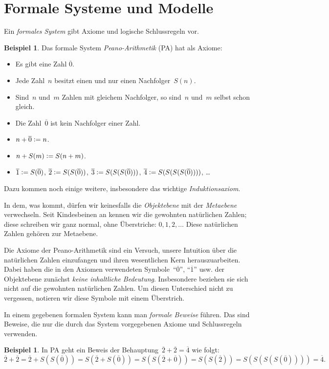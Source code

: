 \documentclass[twoside]{../zirkelblatt1415}
\theoremstyle{definition}
\newtheorem{bsp}[defn]{Beispiel}
\theoremstyle{plain}
\theoremstyle{remark}
\newcommand{\defeq}{\vcentcolon=}
\newcommand{\ol}[1]{\overline{#1}}
\begin{document}
\section{Formale Systeme und Modelle}

Ein \emph{formales System} gibt Axiome und logische Schlussregeln vor.

\begin{bsp}Das formale System \emph{Peano-Arithmetik} (PA) hat als Axiome:
\begin{itemize}
\item Es gibt eine Zahl $\ol{0}$.
\item Jede Zahl~$n$ besitzt einen und nur einen Nachfolger~$S(n)$.
\item Sind~$n$ und~$m$ Zahlen mit gleichem Nachfolger, so sind~$n$ und~$m$
selbst schon gleich.
\item Die Zahl~$\ol{0}$ ist kein Nachfolger einer Zahl.
\item $n + \ol{0} \defeq n$.
\item $n + S(m) \defeq S(n+m)$.
\item $\ol{1} \defeq S(\ol{0})$, $\ol{2} \defeq S(S(\ol{0}))$, $\ol{3} \defeq S(S(S(\ol{0})))$, $\ol{4} \defeq
S(S(S(S(\ol{0}))))$, \ldots
\end{itemize}
Dazu kommen noch einige weitere, insbesondere das wichtige
\emph{Induktionsaxiom}.
\end{bsp}

In dem, was kommt, dürfen wir keinesfalls die \emph{Objektebene} mit der
\emph{Metaebene} verwechseln. Seit Kindesbeinen an kennen wir die gewohnten
natürlichen Zahlen; diese schreiben wir ganz normal, ohne Überstriche:
$0,1,2,\ldots$ Diese natürlichen Zahlen gehören zur Metaebene.

Die Axiome der Peano-Arithmetik sind ein Versuch, unsere Intuition über die
natürlichen Zahlen einzufangen und ihren wesentlichen Kern herauszuarbeiten.
Dabei haben die in den Axiomen verwendeten Symbole~"`$\ol{0}$"', "`$\ol{1}$"'
usw. der Objektebene zunächst \emph{keine inhaltliche Bedeutung}. Insbesondere
beziehen sie sich nicht auf die gewohnten natürlichen Zahlen. Um diesen
Unterschied nicht zu vergessen, notieren wir diese Symbole mit einem
Überstrich.

In einem gegebenen formalen System kann man \emph{formale Beweise} führen. Das
sind Beweise, die nur die durch das System vorgegebenen Axiome und
Schlussregeln verwenden.

\begin{bsp}In PA geht ein Beweis der Behauptung~$\ol{2} + \ol{2} = \ol{4}$ wie folgt:
\[
  \ol{2} + \ol{2} = \ol{2} + S(S(\ol{0})) = S(\ol{2} + S(\ol{0})) = S(S(\ol{2} + \ol{0})) = S(S(\ol{2})) = S(S(S(S(\ol{0})))) = \ol{4}.
\]
\end{bsp}
\end{document}
